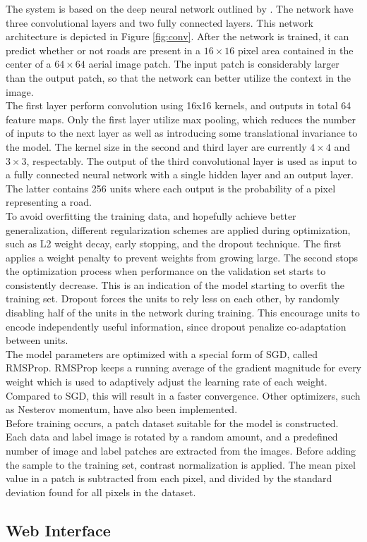 The system is based on the deep neural network outlined by \cite{Mnih_aerial_images_noisy}. The network have three convolutional layers and two fully connected layers. This network architecture is depicted in Figure \ref{fig:conv}. After the network is trained, it can predict whether or not roads are present in a $16 \times 16$ pixel area contained in the center of a $64 \times 64$ aerial image patch. The input patch is considerably larger than the output patch, so that the network can better utilize the context in the image. \\

The first layer perform convolution using 16x16 kernels, and outputs in total 64 feature maps. Only the first layer utilize max pooling, which reduces the number of inputs to the next layer as well as introducing some translational invariance to the model. The kernel size in the second and third layer are currently $4 \times 4$ and $3 \times 3$, respectably. The output of the third convolutional layer is used as input to a fully connected neural network with a single hidden layer and an output layer. The latter contains 256 units where each output is the probability of a pixel representing a road.\\

To avoid overfitting the training data, and hopefully achieve better generalization, different regularization schemes are applied during optimization, such as L2 weight decay, early stopping, and the dropout technique. The first applies a weight penalty to prevent weights from growing large. The second stops the optimization process when performance on the validation set starts to consistently decrease. This is an indication of the model starting to overfit the training set. Dropout forces the units to rely less on each other, by randomly disabling half of the units in the network during training. This encourage units to encode independently useful information, since dropout penalize co-adaptation between units.\\

The model parameters are optimized with a special form of \ac{SGD}, called RMSProp. RMSProp keeps a running average of the gradient magnitude for every weight which is used to adaptively adjust the learning rate of each weight. Compared to \ac{SGD}, this will result in a faster convergence. Other optimizers, such as Nesterov momentum, have also been implemented.\\

Before training occurs, a patch dataset suitable for the model is constructed. Each data and label image is rotated by a random amount, and a predefined number of image and label patches are extracted from the images. Before adding the sample to the training set, contrast normalization is applied. The mean pixel value in a patch is subtracted from each pixel, and divided by the standard deviation found for all pixels in the dataset.\\

\subsection{Web Interface}